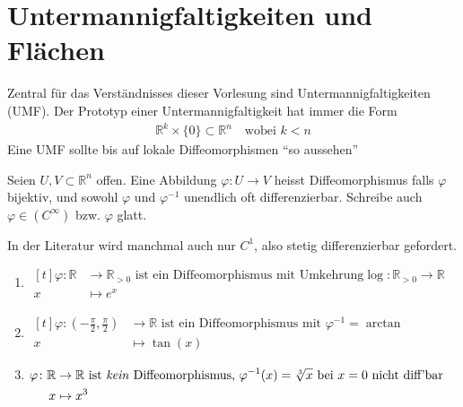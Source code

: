 \documentclass[../main.tex]{subfiles}
\begin{document}
\chapter{Untermannigfaltigkeiten und Flächen}
Zentral für das Verständnisses dieser Vorlesung sind Untermannigfaltigkeiten (UMF). Der Prototyp einer Untermannigfaltigkeit hat immer die Form
\begin{align*}
    \mathbb{R}^k \times \{0\} \subset \mathbb{R}^n \quad \text{wobei } k<n
\end{align*}
Eine UMF sollte bis auf lokale Diffeomorphismen ``so aussehen''


\begin{definition}
Seien $U,V \subset \mathbb{R}^n$ offen. Eine Abbildung $\varphi : U \to V$ heisst Diffeomorphismus falls $\varphi$ bijektiv, und sowohl $\varphi$ und $\varphi ^{-1}$ unendlich oft differenzierbar. Schreibe auch $\varphi\in(C^\infty)$ bzw. $\varphi$ glatt.
\end{definition}
\begin{remark}
In der Literatur wird manchmal auch nur $C^1$, also stetig differenzierbar gefordert.
\end{remark}

\begin{examples}
\leavevmode
\begin{enumerate}
    \item $\begin{aligned}[t] 
        \varphi \colon \mathbb{R} & \to \mathbb{R}_{>0} \text{ ist ein Diffeomorphismus mit Umkehrung} \log \colon \mathbb{R}_{>0} \to \mathbb{R} \\ x & \mapsto e^x
    \end{aligned}$
    
    \item $\begin{aligned}[t] 
        \varphi \colon \left(-\frac{\pi}{2},\frac{\pi}{2} \right) & \to \mathbb{R} \text{ ist ein Diffeomorphismus mit } \varphi^{-1} = \arctan \\ x & \mapsto \tan(x)
    \end{aligned}$
    
    \item $\begin{aligned}[t] 
        \varphi \colon \mathbb{R} & \to \mathbb{R} \text{ ist \emph{kein} Diffeomorphismus, } \varphi^{-1}(x) = \sqrt[3]{x} \text{ bei } x=0 \text{ nicht diff'bar} \\ x & \mapsto x^3
    \end{aligned}$
\end{enumerate}
\end{examples}
\end{document}
